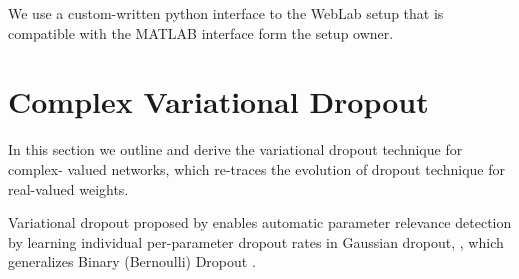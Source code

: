 \documentclass[a4paper,10pt]{article}
\begin{document}
We use a custom-written python interface to the WebLab setup that is compatible with the MATLAB
interface form the setup owner.




\section{Complex Variational Dropout} %
\label{sec:complex_varaitional_dropout}

In this section we outline and derive the variational dropout technique for complex-%
valued networks, which re-traces the evolution of dropout technique for real-valued
weights.

Variational dropout proposed by \cite{kingma_variational_2015} enables automatic parameter
relevance detection by learning individual per-parameter dropout rates in Gaussian dropout,
\cite{srivastava_dropout_2014,wang_fast_2013}, which generalizes Binary (Bernoulli) Dropout
\cite{hinton_improving_2012}.
\end{document}
